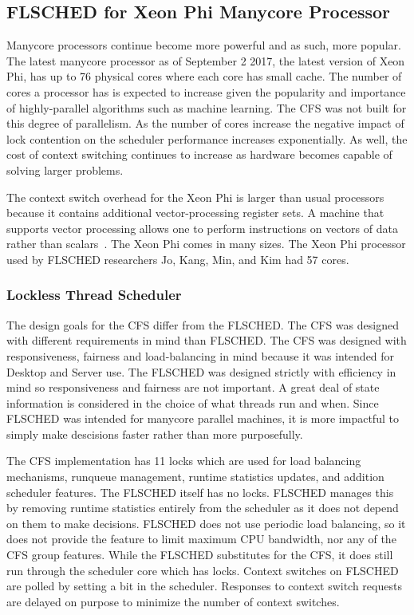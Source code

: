 \documentclass{sig-alternate}
\begin{document}
\subsection{FLSCHED for Xeon Phi Manycore Processor}
\label{sec:flsched}

Manycore processors continue become more powerful and as such, more popular. The latest manycore processor as of September 2 2017, the latest version of Xeon Phi, has up to 76 physical cores where each core has small cache. The number of cores a processor has is expected to increase given the popularity and importance of highly-parallel algorithms such as machine learning. The CFS was not built for this degree of parallelism. As the number of cores increase the negative impact of lock contention on the scheduler performance increases exponentially. As well, the cost of context switching continues to increase as hardware becomes capable of solving larger problems.

The context switch overhead for the Xeon Phi is larger than usual processors because it contains additional vector-processing register sets. \cite{Jo:2017} A machine that supports vector processing allows one to perform instructions on vectors of data rather than scalars~\cite{Mellon}. The Xeon Phi comes in many sizes. The Xeon Phi processor used by FLSCHED researchers Jo, Kang, Min, and Kim had 57 cores. ~\cite{Jo:2017}

\subsubsection{Lockless Thread Scheduler}
\label{sec:flsched_about}

The design goals for the CFS differ from the FLSCHED. The CFS was designed with different requirements in mind than FLSCHED. The CFS was designed with responsiveness, fairness and load-balancing in mind because it was intended for Desktop and Server use. The FLSCHED was designed strictly with efficiency in mind so responsiveness and fairness are not important. A great deal of state information is considered in the choice of what threads run and when. Since FLSCHED was intended for manycore parallel machines, it is more impactful to simply make descisions faster rather than more purposefully.~\cite{Jo:2017}

The CFS implementation has 11 locks which are used for load balancing mechanisms, runqueue management, runtime statistics updates, and addition scheduler features. The FLSCHED itself has no locks. FLSCHED manages this by removing runtime statistics entirely from the scheduler as it does not depend on them to make decisions. FLSCHED does not use periodic load balancing, so it does not provide the feature to limit maximum CPU bandwidth, nor any of the CFS group features. While the FLSCHED substitutes for the CFS, it does still run through the scheduler core which has locks. Context switches on FLSCHED are polled by setting a bit in the scheduler. Responses to context switch requests are delayed on purpose to minimize the number of context switches.~\cite{Jo:2017}
\end{document}
